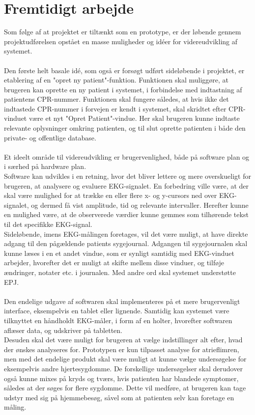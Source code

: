 \section{Fremtidigt arbejde}
Som følge af at projektet er tiltænkt som en prototype, er der løbende gennem projektudførelsen opstået en masse muligheder og idéer for videreudvikling af systemet. \\\\
Den første helt basale idé, som også er forsøgt udført sideløbende i projektet, er etablering af en "opret ny patient"\--funktion. Funktionen skal muliggøre, at brugeren kan oprette en ny patient i systemet, i forbindelse med indtastning af patientens CPR-nummer. Funktionen skal fungere således, at hvis ikke det indtastede CPR-nummer i forvejen er kendt i systemet, skal skridtet efter CPR-vinduet være et nyt "Opret Patient"\--vindue. Her skal brugeren kunne indtaste relevante oplysninger omkring patienten, og til slut oprette patienten i både den private- og offentlige database.\\\\
Et ideelt område til videreudvikling er brugervenlighed, både på software plan og i særhed på hardware plan.\\
Software kan udvikles i en retning, hvor det bliver lettere og mere overskueligt for brugeren, at analysere og evaluere EKG-signalet. En forbedring ville være, at der skal være mulighed for at trække en eller flere x- og y-cursors ned over EKG-signalet, og dermed få vist amplitude, tid og relevante intervaller. Herefter kunne en mulighed være, at de observerede værdier kunne gemmes som tilhørende tekst til det specifikke EKG-signal. \\
Sideløbende, imens EKG-målingen foretages, vil det være muligt, at have direkte adgang til den pågældende patients sygejournal. Adgangen til sygejournalen skal kunne læses i en et andet vindue, som er synligt samtidig med EKG-vinduet arbejder, hvorefter det er muligt at skifte mellem disse vinduer, og tilføje ændringer, notater etc. i journalen. Med andre ord skal systemet understøtte EPJ.\\ \\
Den endelige udgave af softwaren skal implementeres på et mere brugervenligt interface, eksempelvis en tablet eller lignende. Samtidig kan systemet være tilknyttet en håndholdt EKG-måler, i form af en holter, hvorefter softwaren aflæser data, og udskriver på tabletten.\\ Desuden skal det være muligt for brugeren at vælge indstillinger alt efter, hvad der ønskes analyseres for. Prototypen er kun tilpasset analyse for atrieflimren, men med det endelige produkt skal være muligt at kunne vælge undersøgelse for eksempelvis andre hjertesygdomme. De forskellige undersøgelser skal derudover også kunne mixes på kryds og tværs, hvis patienten har blandede symptomer, således at der søges for flere sygdomme. Dette vil medføre, at brugeren kan tage udstyr med sig på hjemmebesøg, såvel som at patienten selv kan foretage en måling.

